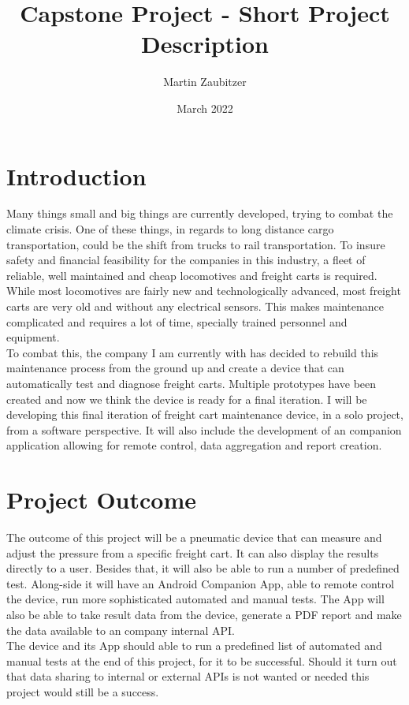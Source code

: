 \documentclass[a4paper,12pt]{article}
\title{Capstone Project - Short Project Description}
\author{Martin Zaubitzer }
\date{March 2022}
\begin{document}
\maketitle

\section*{Introduction}
Many things small and big things are currently developed, trying to combat the climate crisis. One of these things, in regards to long distance cargo transportation, could be the shift from trucks to rail transportation. To insure safety and financial feasibility for the companies in this industry, a fleet of reliable, well maintained and cheap locomotives and freight carts is required. While most locomotives are fairly new and technologically advanced, most freight carts are very old and without any electrical sensors. This makes maintenance complicated and requires a lot of time, specially trained personnel and equipment. \\

\noindent To combat this, the company I am currently with has decided to rebuild this maintenance process from the ground up and create a device that can automatically test and diagnose freight carts. Multiple prototypes have been created and now we think the device is ready for a final iteration. I will be developing this final iteration of freight cart maintenance device, in a solo project, from a software perspective. It will also include the development of an companion application allowing for remote control, data aggregation and report creation. 

\section*{Project Outcome}
The outcome of this project will be a pneumatic device that can measure and adjust the pressure from a specific freight cart. It can also display the results directly to a user. Besides that, it will also be able to run a number of predefined test. Along-side it will have an Android Companion App, able to remote control the device, run more sophisticated automated and manual tests. The App will also be able to take result data from the device, generate a PDF report and make the data available to an company internal API.
\\
\noindent The device and its App should able to run a predefined list of automated and manual tests at the end of this project, for it to be successful. Should it turn out that data sharing to internal or external APIs is not wanted or needed this project would still be a success.
\end{document}
